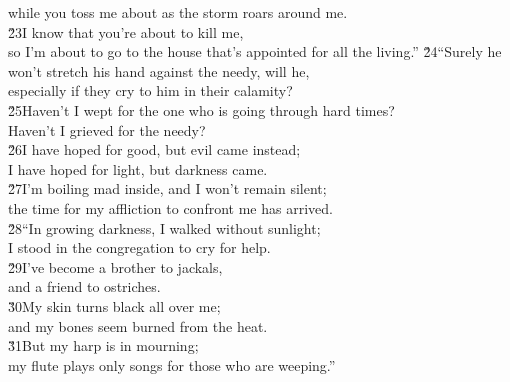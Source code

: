 \begin{poetry}
\poemlll       while you toss me about as the storm roars around me. \\
\poeml \v{23}I know that you're about to kill me, \\
\poemll    so I'm about to go to the house that's appointed for all the living.''
\poeml \v{24}``Surely he won't stretch his hand against the needy, will he, \\
\poemll    especially if they cry to him in their calamity? \\
\poeml \v{25}Haven't I wept for the one who is going through hard times? \\
\poemll    Haven't I grieved for the needy? \\
\poeml \v{26}I have hoped for good, but evil came instead; \\
\poemll    I have hoped for light, but darkness came. \\
\poeml \v{27}I'm boiling mad inside, and I won't remain silent; \\
\poemll    the time for my affliction to confront me has arrived. \\
\poeml \v{28}``In growing darkness, I walked without sunlight; \\
\poemll    I stood in the congregation to cry for help. \\
\poeml \v{29}I've become a brother to jackals, \\
\poemll    and a friend to ostriches. \\
\poeml \v{30}My skin turns black all over me; \\
\poemll    and my bones seem burned from the heat. \\
\poeml \v{31}But my harp is in mourning; \\
\poemll    my flute plays only songs for those who are weeping.''
\end{poetry}

